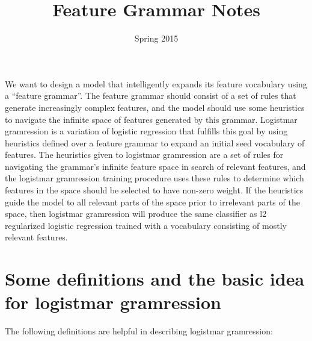 \documentclass[11pt,letterpaper]{article}
\title{Feature Grammar Notes}
\date{Spring 2015}
\begin{document}
\maketitle

We want to design a model that intelligently 
expands its feature vocabulary using a ``feature grammar''.
The feature grammar should consist of a set of rules that 
generate increasingly complex features, and the model
should use some heuristics to navigate the infinite space
of features generated by this grammar. Logistmar gramression is a 
variation of logistic regression that 
fulfills this goal by using heuristics defined over 
a feature grammar to
expand an initial seed vocabulary of features.  The
heuristics given to logistmar gramression are a set 
of rules for navigating the grammar's 
infinite feature space in search of relevant features, and the 
logistmar gramression training procedure uses these rules to 
determine which features in
the space should be 
selected to have non-zero weight. If the heuristics guide the
model to all relevant parts of the space prior to 
irrelevant parts of the space, then logistmar gramression will 
produce the same classifier as l2 regularized logistic regression 
trained with a vocabulary consisting of mostly relevant features.

\section{Some definitions and the basic idea for logistmar gramression}

The following definitions are helpful in describing logistmar gramression:
\end{document}
